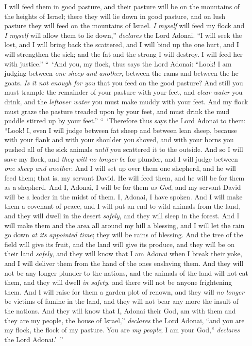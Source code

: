 \begin{biblechapter}
\verse I will feed them in good pasture, and their pasture will be on the mountains of the heights of Israel; there they will lie down in good pasture, and on lush pasture they will feed on the mountains of Israel.
\verse \textit{I myself} will feed my flock and \textit{I myself} will allow them to lie down,” \textit{declares} the Lord Adonai.
\verse “I will seek the lost, and I will bring back the scattered, and I will bind up the one hurt, and I will strengthen the sick; and the fat and the strong I will destroy. I will feed her with justice.”
\verse “ ‘And you, my flock, thus says the Lord Adonai: “Look! I am judging between \textit{one sheep and another}, between the rams and between the he-goats.
\verse \textit{Is it not enough for you} that you feed on the good pasture? And still you must trample the remainder of your pasture with your feet, and \textit{clear water} you drink, and the \textit{leftover water} you must make muddy with your feet.
\verse And my flock must graze the pasture treaded upon by your feet, and must drink the mud puddle stirred up by your feet.”
\verse “ ‘Therefore thus says the Lord Adonai to them: “Look! I, even I will judge between fat sheep and between lean sheep,
\verse because with your flank and with your shoulder you shoved, and with your horns you pushed all of the sick animals \textit{until} you scattered it to the outside.
\verse And so I will save my flock, and \textit{they will no longer be} for plunder, and I will judge between \textit{one sheep and another}.
\verse And I will set up over them one shepherd, and he will feed them; that is, my servant David. He will feed them, and he will be for them as a shepherd.
\verse And I, Adonai, I will be for them \textit{as God}, and my servant David will be a leader in the midst of them. I, Adonai, I have spoken.
\verse And I will make them a covenant of peace, and I will put an end to wild animals from the land, and they will dwell in the desert \textit{safely}, and they will sleep in the forest.
\verse And I will make them and the area all around my hill a blessing, and I will let the rain go down \textit{at its appointed time}; they will be rains of blessing.
\verse And the tree of the field will give its fruit, and the land will give its produce, and they will be on their land \textit{safely}, and they will know that I am Adonai when I break their yoke, and I will deliver them from the hand of the ones enslaving them.
\verse And they will not be any longer plunder to the nations, and the animals of the land will not eat them, and they will dwell \textit{in safety}, and there will not be anyone frightening them.
\verse And I will raise for them a garden plot of renown, and they will \textit{no longer} be victims of famine in the land, and they will not bear any more the insult of the nations.
\verse And they will know that I, Adonai their God, am with them and they are my people, the house of Israel,” \textit{declares} the Lord Adonai,
\verse “and you are my flock, the flock of my pasture. You are \textit{my people}; I am your God,” \textit{declares} the Lord Adonai.’ ”
\end{biblechapter}

